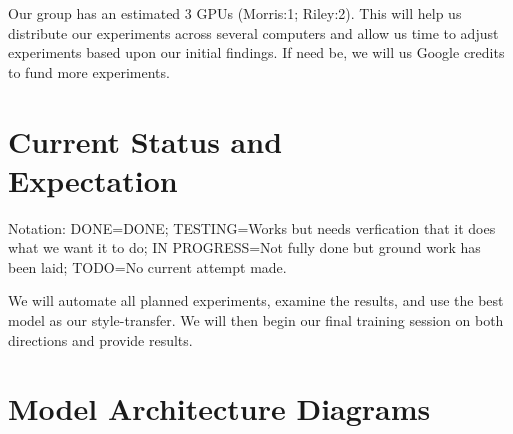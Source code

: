 \documentclass[twoside,twocolumn]{article}
\begin{document}
Our group has an estimated 3 GPUs (Morris:1; Riley:2). This will help us
distribute our experiments across several computers and allow us time to adjust
experiments based upon our initial findings. If need be, we will us Google
credits to fund more experiments.




\section{Current Status and\\Expectation}
Notation: DONE=DONE; TESTING=Works but needs verfication that it does what we
want it to do; IN PROGRESS=Not fully done but ground work has been laid;
TODO=No current attempt made.



We will automate all planned experiments, examine the results, and use the best
model as our style-transfer. We will then begin our final training session
on both directions and provide results.









\clearpage
\appendix
\onecolumn
\section{Model Architecture Diagrams}
\end{document}

